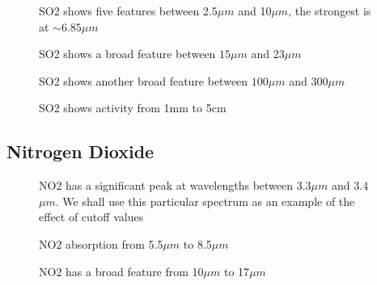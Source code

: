 \documentclass[12pt]{article}
\begin{document}
\vspace*{13.5cm}
\begin{figure}[htb]
\caption{SO2 shows five features between 2.5$\mu m$ and 10$\mu m$, the strongest
 is at $\sim 6.85\mu m$}
\end{figure}
\newpage


\vspace*{11.5cm}
\begin{figure}[htb]
\caption{SO2 shows a broad feature between $15\mu m$ and 23$\mu m$}
\end{figure}
\newpage


\vspace*{11.5cm}
\begin{figure}[htb]
\caption{SO2 shows another broad feature between $100\mu m$ and 300$\mu m$}
\end{figure}
\newpage

\vspace*{11.5cm}
\begin{figure}[htb]
\caption{SO2 shows activity from 1mm to 5cm}
\end{figure}
\newpage

\subsection{Nitrogen Dioxide}


\vspace*{13.5cm}
\begin{figure}[htb]
\caption{NO2 has a significant peak at wavelengths between 3.3$\mu m$ and 3.4$\mu m$.
We shall use this particular spectrum as an example of the effect of cutoff values}
\end{figure}
\newpage


\vspace*{11.5cm}
\begin{figure}[htb]
\caption{NO2 absorption from  5.5$\mu m$ to 8.5$\mu m$}
\end{figure}
\newpage

\vspace*{11.5cm}
\begin{figure}[htb]
\caption{NO2 has a broad feature from 10$\mu m$ to 17$\mu m$}
\end{figure}
\newpage
\end{document}
